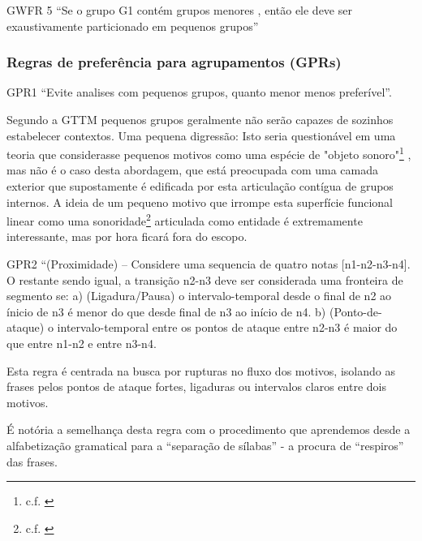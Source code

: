 \documentclass[
	12pt,				%
	openright,			%
	twoside,			%
	a4paper,			%
	english,			%
	french,				%
	spanish,			%
	brazil				%
	]{abntex2}
\begin{document}
\begin{citacao}
GWFR 5 “Se o grupo G1 contém grupos menores , então ele deve ser exaustivamente particionado em pequenos grupos”
\cite[ p.38]{lerdahl1983generative}
\end{citacao}

\subsubsection{Regras de preferência para agrupamentos (GPRs)}

\begin{citacao}
GPR1 “Evite analises com pequenos grupos, quanto menor menos preferível”.
\cite[ p.43]{lerdahl1983generative}
\end{citacao}


Segundo a GTTM pequenos grupos geralmente não serão capazes de sozinhos estabelecer contextos. Uma pequena digressão: Isto seria questionável em uma teoria que considerasse pequenos motivos como uma espécie de "objeto sonoro"\footnote{c.f. \cite{guigue1995analise}} , mas não é o caso desta abordagem, que está preocupada com uma camada exterior que supostamente é edificada por esta articulação contígua de grupos internos. A ideia de um pequeno motivo que irrompe esta superfície funcional linear como uma sonoridade\footnote{c.f. \cite{guigue2012}} articulada como entidade é extremamente interessante, mas por hora ficará fora do escopo.

\begin{citacao}
GPR2 “(Proximidade) – Considere uma sequencia de quatro notas [n1-n2-n3-n4].\linebreak
O restante sendo igual, a transição n2-n3 deve ser considerada uma fronteira de segmento se:\linebreak
a) (Ligadura/Pausa) o intervalo-temporal desde o final de n2 ao ínicio de n3 é menor do que desde final de n3 ao início de n4.\linebreak
b) (Ponto-de-ataque) o intervalo-temporal entre os pontos de ataque entre n2-n3 é maior do que entre n1-n2  e entre n3-n4.
\cite[ p.45]{lerdahl1983generative}
\end{citacao}

Esta regra é centrada na busca por rupturas no fluxo dos motivos, isolando as frases pelos pontos de ataque fortes, ligaduras ou intervalos claros entre dois motivos.  


É notória a semelhança desta regra com o procedimento que aprendemos desde a alfabetização gramatical para a “separação de sílabas” - a procura de “respiros” das frases. 
\end{document}
